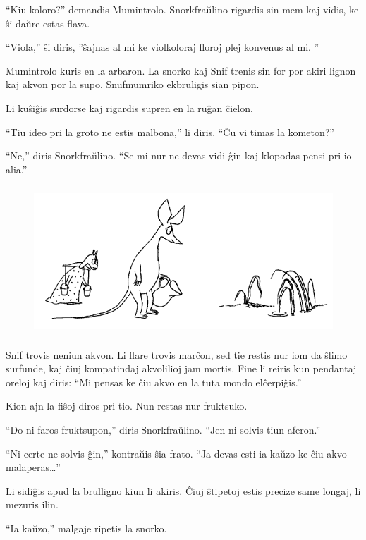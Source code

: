 ``Kiu koloro?'' demandis Mumintrolo. Snorkfraŭlino rigardis sin mem kaj vidis, ke ŝi daŭre estas flava.

``Viola,'' ŝi diris, ''ŝajnas al mi ke violkoloraj floroj plej konvenus al mi. ''

Mumintrolo kuris en la arbaron. La snorko kaj Snif trenis sin for por akiri lignon kaj akvon por la supo. Snufmumriko ekbruligis sian pipon.

Li kuŝiĝis surdorse kaj rigardis supren en la ruĝan ĉielon.

``Tiu ideo pri la groto ne estis malbona,'' li diris. ``Ĉu vi timas la kometon?''

``Ne,'' diris Snorkfraŭlino. ``Se mi nur ne devas vidi ĝin kaj klopodas pensi pri io alia.''

\begin{figure}[htbp]
\centering
\includegraphics[width=350pt,height=158pt]{5-6.png}
\caption{}
\label{5-6}
\end{figure}

Snif trovis neniun akvon. Li flare trovis marĉon, sed tie restis nur iom da ŝlimo surfunde, kaj ĉiuj kompatindaj akvolilioj jam mortis. Fine li reiris kun pendantaj oreloj kaj diris: ``Mi pensas ke ĉiu akvo en la tuta mondo elĉerpiĝis.''

Kion ajn la fiŝoj diros pri tio. Nun restas nur fruktsuko.

``Do ni faros fruktsupon,'' diris Snorkfraŭlino. ``Jen ni solvis tiun aferon.''

``Ni certe ne solvis ĝin,'' kontraŭis ŝia frato. ``Ja devas esti ia kaŭzo ke ĉiu akvo malaperas{\ldots}''

Li sidiĝis apud la brulligno kiun li akiris. Ĉiuj ŝtipetoj estis precize same longaj, li mezuris ilin.

``Ia kaŭzo,'' malgaje ripetis la snorko.

